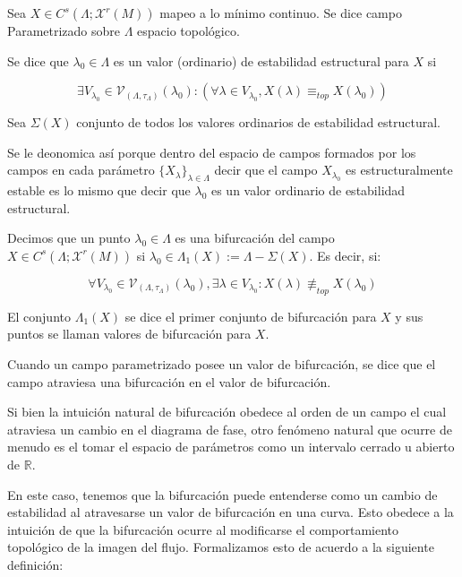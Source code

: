 \begin{defn}
	Sea $X \in C^s(\Lambda;\mathcal{X}^r(M))$ mapeo a lo mínimo continuo. Se dice campo Parametrizado sobre $\Lambda$ espacio topológico. 
	
	Se dice que $\lambda_0 \in \Lambda$ es un valor (ordinario) de estabilidad estructural para $X$ si 
	
	\begin{equation*}
		\exists V_{\lambda_0} \in \mathcal{V}_{(\Lambda,\tau_\Lambda)}(\lambda_0) : (\forall \lambda \in V_{\lambda_0} , X(\lambda)\equiv_{top} X(\lambda_0) )
	\end{equation*}
	
	Sea $\Sigma(X)$ conjunto de todos los valores ordinarios de estabilidad estructural. 
	
	Se le deonomica así porque dentro del espacio de campos formados por los campos en cada parámetro $\{X_\lambda\}_{\lambda \in \Lambda}$ decir que el campo $X_{\lambda_0} $ es estructuralmente estable es lo mismo que decir que $\lambda_0$ es un valor ordinario de estabilidad estructural.
\end{defn}

\begin{defn}[Bifurcación]
	Decimos que un punto $\lambda_0 \in \Lambda$ es una bifurcación del campo
	$X \in C^s(\Lambda;\mathcal{X}^r(M))$  si $\lambda_0 \in \Lambda_1(X):= \Lambda - \Sigma(X)$. Es decir, si:
	
	\begin{equation*}
		\forall V_{\lambda_0}\in \mathcal{V}_{(\Lambda,\tau_\Lambda)}(\lambda_0) ,   \exists \lambda \in V_{\lambda_0}:  X(\lambda)\not \equiv_{top} X(\lambda_0) 
	\end{equation*}
	
	El conjunto $\Lambda_1(X)$ se dice el primer conjunto de bifurcación para $X$ y sus puntos se llaman valores de bifurcación para $X$. 
	
	Cuando un campo parametrizado posee un valor de bifurcación, se dice que el campo atraviesa una bifurcación en el valor de bifurcación.
\end{defn}


\begin{rmrk}
	Si bien la intuición natural de bifurcación obedece al orden de un campo el cual atraviesa un cambio en el diagrama de fase, otro fenómeno natural que ocurre de menudo es el tomar el espacio de parámetros como un intervalo cerrado u abierto de $\mathbb{R}$. 
	
	En este caso, tenemos que  la bifurcación puede entenderse como un cambio de estabilidad al atravesarse un valor de bifurcación en una curva. Esto obedece a la intuición de que la bifurcación ocurre al modificarse el comportamiento topológico de la imagen del flujo. Formalizamos esto de acuerdo a la siguiente definición:
\end{rmrk}

